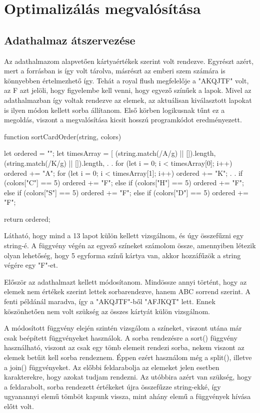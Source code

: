 \section{Optimalizálás megvalósítása}

\subsection{Adathalmaz átszervezése}
Az adathalmazom alapvetően kártyaértékek szerint volt rendezve. Egyrészt azért, mert a forrásban is így volt tárolva, másrészt az emberi szem számára is könnyebben értelmezhető így. Tehát a royal flush megfelelője a "AKQJTF" volt, az F azt jelöli, hogy figyelembe kell venni, hogy egyező színűek a lapok. Mivel az adathalmazban így voltak rendezve az elemek, az aktuálisan kiválasztott lapokat is ilyen módon kellett sorba állítanom. Első körben logikusnak tűnt ez a megoldás, viszont a megvalósítása kicsit hosszú programkódot eredményezett. 

\begin{python}
function sortCardOrder(string, colors) {
  let ordered = "";
  let timesArray = [
    (string.match(/A/g) || []).length,
    (string.match(/K/g) || []).length,
    .
    .
  for (let i = 0; i < timesArray[0]; i++) {
    ordered += "A";
  }
  for (let i = 0; i < timesArray[1]; i++) {
    ordered += "K";
  }
  .
  .
  if (colors["C"] == 5) {
    ordered += "F";
  } else if (colors["H"] == 5) {
    ordered += "F";
  } else if (colors["S"] == 5) {
    ordered += "F";
  } else if (colors["D"] == 5) {
    ordered += "F";
  }

  return ordered;
}
\end{python}

Látható, hogy mind a 13 lapot külön kellett vizsgálnom, és úgy összefűzni egy string-é. A függvény végén az egyező színeket számolom össze, amennyiben létezik olyan lehetőség, hogy 5 egyforma színű kártya van, akkor hozzáfűzök a string végére egy "F"-et.

Először az adathalmazt kellett módosítanom. Mindössze annyi történt, hogy az elemek nem értékek szerint lettek sorbarendezve, hanem ABC sorrend szerint. A fenti példánál maradva, így a "AKQJTF"-ből "AFJKQT" lett. Ennek köszönhetően nem volt szükség az összes kártyát külön vizsgálnom.

A módosított függvény elején szintén vizsgálom a színeket, viszont utána már csak beépített függvényeket használok. A sorba rendezésre a sort() függvény használható, viszont az csak egy tömb elemeit rendezi sorba, nekem viszont az elemek betűit kell sorba rendeznem. Éppen ezért használom még a split(), illetve a join() függvényeket. Az előbbi feldarabolja az elemeket jelen esetben karakterekre, hogy azokat tudjam rendezni. Az utóbbira azért van szükség, hogy a feldarabolt, sorba rendezett értékeket újra összefűzze string-ekké, így ugyanannyi elemű tömböt kapunk vissza, mint ahány elemű a függvények hívása előtt volt. 

